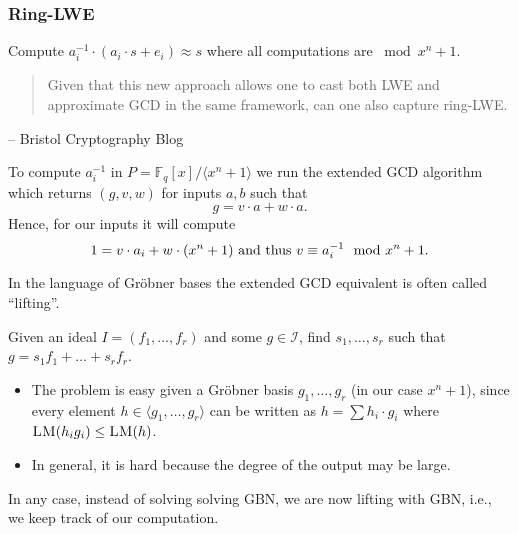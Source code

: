 \documentclass[10pt]{beamer}
\newcommand{\ideal}[1]{\langle {#1} \rangle}
\newcommand{\LM}[1]{\ensuremath{\textsc{LM}(#1)\xspace}}
\newcommand{\I}{\ensuremath{\mathcal{I}}\xspace}
\begin{document}
\begin{frame}
\frametitle{Ring-LWE} 

Compute $a_i^{-1} \cdot (a_i \cdot s + e_i) \approx s$ where all computations are $\bmod x^n + 1$.

\vspace{1em}

\begin{quote}
Given that this new approach allows one to cast both LWE and approximate GCD in the same framework, can one also capture ring-LWE.
\end{quote}
\vspace{-2em}
\begin{flushright}
-- Bristol Cryptography Blog 
\end{flushright}

\vspace{1em}

To compute $a_i^{-1}$ in $P = \mathbb{F}_q[x] / \ideal{x^n+1}$ we run the extended GCD algorithm which returns $(g,v,w)$ for inputs $a,b$ such that $$g = v \cdot a + w \cdot a.$$ Hence, for our inputs it will compute $$1= v\cdot a_i + w \cdot (x^n + 1) \textnormal{ and thus }v \equiv a_i^{-1} \mod x^n + 1.$$

\framebreak

In the language of Gröbner bases the extended GCD equivalent is often called ``lifting''.

\vspace{0.5em}

\begin{block}{}
Given an ideal $I = (f_1,...,f_r)$ and some $g \in \I$, find $s_1,\dots,s_r$ such that $g = s_1 f_1 + \dots + s_r f_r$.  
\end{block}

\vspace{1em}

\begin{itemize}
 \item The problem is easy given a Gröbner basis $g_1,\dots,g_r$ (in our case $x^n + 1$), since every element $h \in \ideal{g_1,\dots,g_r}$ can be written as $h = \sum h_i \cdot g_i$ where $\LM{h_ig_i} \leq \LM{h}$.
 \item In general, it is hard because the degree of the output may be large.
\end{itemize}

In any case, instead of solving solving GBN, we are now lifting with GBN, i.e., we keep track of our computation.


\end{frame}
\end{document}
